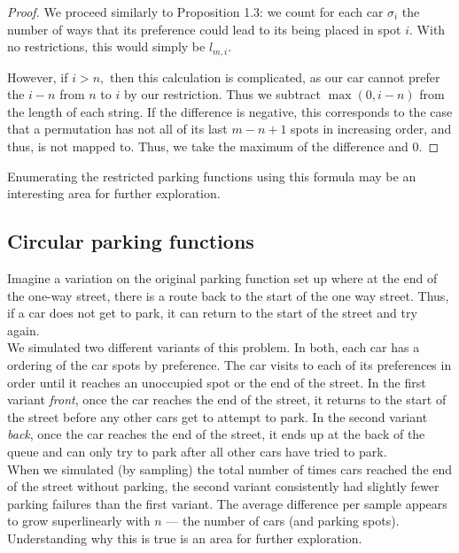 \begin{proof}
    We proceed similarly to Proposition 1.3: we count for each car $\sigma_i$ the number of ways that its preference could lead to its being placed in spot $i.$ With no restrictions, this would simply be $l_{m,i}.$
    
    However, if $i>n,$ then this calculation is complicated, as our car cannot prefer the $i-n$ from $n$ to $i$ by our restriction. Thus we subtract $\max(0,i-n)$ from the length of each string. If the difference is negative, this corresponds to the case that a permutation has not all of its last $m - n + 1$ spots in increasing order, and thus, is not mapped to. Thus, we take the maximum of the difference and $0$.
\end{proof}

Enumerating the restricted parking functions using this formula may be an interesting area for further exploration.

\subsection*{Circular parking functions}

Imagine a variation on the original parking function set up where at the end of the one-way street, there is a route back to the start of the one way street. Thus, if a car does not get to park, it can return to the start of the street and try again. \\

We simulated two different variants of this problem. In both, each car has a ordering of the car spots by preference. The car visits to each of its preferences in order until it reaches an unoccupied spot or the end of the street. In the first variant \textit{front}, once the car reaches the end of the street, it returns to the start of the street before any other cars get to attempt to park. In the second variant \textit{back}, once the car reaches the end of the street, it ends up at the back of the queue and can only try to park after all other cars have tried to park. \\

When we simulated (by sampling) the total number of times cars reached the end of the street without parking, the second variant consistently had slightly fewer parking failures than the first variant. The average difference per sample appears to grow superlinearly with $n$ --- the number of cars (and parking spots). Understanding why this is true is an area for further exploration.
